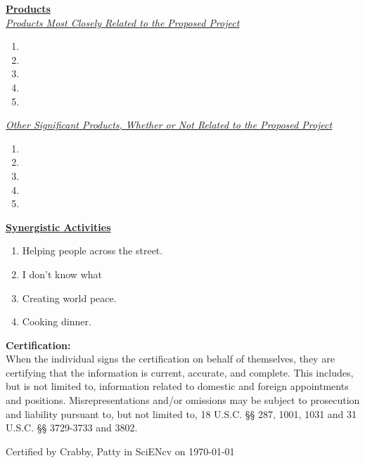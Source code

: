 \documentclass[11pt]{article}
\begin{document}
\noindent
{\bf \underline{Products}} \\
{\em \underline{Products Most Closely Related to the Proposed Project}}
\begin{enumerate}
\item
{}
\item
{}
\item
{}
\item
{}
\item
{}
\end{enumerate}

\noindent
{\em \underline{Other Significant Products, Whether or Not Related to the Proposed Project}}
\begin{enumerate}
\item
{}
\item
{}
\item
{}
\item
{}
\item
{}
\end{enumerate}

\noindent
{\bf \underline{Synergistic Activities}}
\vspace{-0.4\baselineskip}
\begin{enumerate}
\item Helping people across the street.
\item I don't know what
\item Creating world peace.
\item Cooking dinner.
\end{enumerate}

\noindent
{\bf Certification:}\\
When the individual signs the certification on behalf of themselves, they are certifying that the information is current, accurate, and complete. This includes, but is not limited to, information related to domestic and foreign appointments and positions. Misrepresentations and/or omissions may be subject to prosecution and liability pursuant to, but not limited to, 18 U.S.C. §§ 287, 1001, 1031 and 31 U.S.C. §§ 3729-3733 and 3802.

\vspace{\baselineskip}
\noindent
Certified by Crabby, Patty in SciENcv on \today
\end{document}
